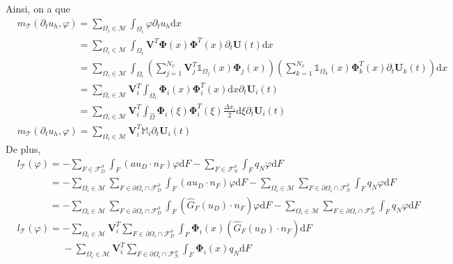 \documentclass[11pt, a4paper, oneside]{report}
\begin{document}
Ainsi, on a que
\begin{equation}
    \begin{aligned}
        &m_\mathcal{T}(\partial_t u_h, \varphi) = \sum_{\Omega_i \in \mathcal{M}} \int_{\Omega_i} \varphi \partial_t u_h \text{d}x \\
        &\phantom{m_\mathcal{T}(\partial_t u_h, \varphi) } = \sum_{\Omega_i \in \mathcal{M}} \int_{\Omega_i} \bm{V}^T \bm{\Phi}(x) \bm{\Phi}^T(x) \partial_t \bm{U}(t) \text{d}x \\
        &\phantom{m_\mathcal{T}(\partial_t u_h, \varphi) } = \sum_{\Omega_i \in \mathcal{M}} \int_{\Omega_i} \left( \sum_{j = 1}^{N_x} \bm{V}_j^T \mathds{1}_{\Omega_j}(x) \bm{\Phi}_j(x) \right) \left( \sum_{k = 1}^{N_x} \mathds{1}_{\Omega_k}(x) \bm{\Phi}_k^T(x) \partial_t \bm{U}_k(t) \right) \text{d}x \\
        &\phantom{m_\mathcal{T}(\partial_t u_h, \varphi) } = \sum_{\Omega_i \in \mathcal{M}} \bm{V}_i^T \int_{\Omega_i} \bm{\Phi}_i(x) \bm{\Phi}_i^T(x) \text{d}x \partial_t \bm{U}_i(t) \\
        &\phantom{m_\mathcal{T}(\partial_t u_h, \varphi) } = \sum_{\Omega_i \in \mathcal{M}} \bm{V}_i^T \int_{\widehat{\Omega}} \bm{\Phi}_i(\xi) \bm{\Phi}_i^T(\xi) \frac{\Delta x_i}{2} \text{d}\xi \partial_t \bm{U}_i(t) \\
        &m_\mathcal{T}(\partial_t u_h, \varphi) = \sum_{\Omega_i \in \mathcal{M}} \bm{V}_i^T \mathbb{M}_i \partial_t \bm{U}_i(t)
    \end{aligned}
\end{equation}
De plus,
\begin{equation}
    \begin{aligned}
        &l_\mathcal{T}(\varphi) = - \sum_{F \in \mathcal{F}_D^\partial} \int_F (a u_D \cdot n_F) \varphi \text{d}F - \sum_{F \in \mathcal{F}_N^\partial} \int_F q_N \varphi \text{d}F \\
        &\phantom{l_\mathcal{T}(\varphi) } = - \sum_{\Omega_i \in \mathcal{M}} \sum_{F \in \partial \Omega_i \cap \mathcal{F}_D^\partial} \int_F (au_D \cdot n_F) \varphi \text{d}F - \sum_{\Omega_i \in \mathcal{M}} \sum_{F \in \partial \Omega_i \cap \mathcal{F}_N^\partial} \int_F q_N \varphi \text{d}F \\
        &\phantom{l_\mathcal{T}(\varphi) } = - \sum_{\Omega_i \in \mathcal{M}} \sum_{F \in \partial \Omega_i \cap \mathcal{F}_D^\partial} \int_F (\widehat{G}_F(u_D) \cdot n_F) \varphi \text{d}F - \sum_{\Omega_i \in \mathcal{M}} \sum_{F \in \partial \Omega_i \cap \mathcal{F}_N^\partial} \int_F q_N \varphi \text{d}F \\
        &l_\mathcal{T}(\varphi) = - \sum_{\Omega_i \in \mathcal{M}} \bm{V}_i^T \sum_{F \in \partial \Omega_i \cap \mathcal{F}_D^\partial} \int_F \bm{\Phi}_i(x) (\widehat{G}_F(u_D) \cdot n_F) \text{d}F \\
        &\phantom{l_\mathcal{T}(\varphi) =} - \sum_{\Omega_i \in \mathcal{M}} \bm{V}_i^T \sum_{F \in \partial \Omega_i \cap \mathcal{F}_N^\partial} \int_F \bm{\Phi}_i(x) q_N \text{d}F
    \end{aligned}
\end{equation}
\end{document}
